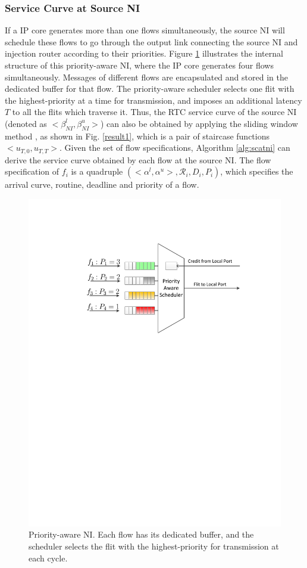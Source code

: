 \documentclass[preprint]{elsarticle}
\begin{document}
\subsubsection{Service Curve at Source NI}
If a IP core generates more than one flows simultaneously, the source NI will schedule these flows to go through the output link connecting the source NI and injection router according to their priorities. Figure \ref{ni} illustrates the internal structure of this priority-aware NI, where the IP core generates four flows simultaneously. Messages of different flows are encapsulated and stored in the dedicated buffer for that flow. The priority-aware scheduler selects one flit with the highest-priority at a time for transmission, and imposes an additional latency $T$ to all the flits which traverse it. Thus, the RTC service curve of the source NI (denoted as $<\beta^l_{NI},\beta^u_{NI}>$) can also be obtained by applying the sliding window method \cite{1253607}, as shown in Fig. \ref{result1}, which is a pair of staircase functions $<u_{T,0},u_{T,T}>$. Given the set of flow specifications, Algorithm \ref{alg:scatni} can derive the service curve obtained by each flow at the source NI. The flow specification of $f_i$ is a quadruple $(<\alpha^l,\alpha^u>,\mathcal{R}_i,D_i,P_i)$, which specifies the arrival curve, routine, deadline and priority of a flow.
\begin{figure}
  \centering
  \includegraphics[scale=0.45]{figures/NI.pdf}
  \caption{Priority-aware NI. Each flow has its dedicated buffer, and the scheduler selects the flit with the highest-priority for transmission at each cycle.}\label{ni}
\end{figure}
\end{document}

